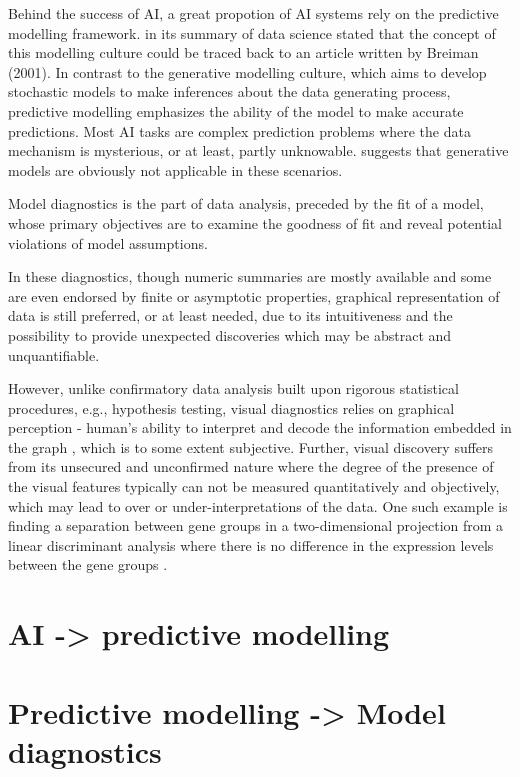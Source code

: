 \documentclass{monashthesis}
\begin{document}
Behind the success of AI, a great propotion of AI systems rely on the predictive modelling framework. \textcite{donoho_50_2017} in its summary of data science stated that the concept of this modelling culture could be traced back to an article written by Breiman (2001). In contrast to the generative modelling culture, which aims to develop stochastic models to make inferences about the data generating process, predictive modelling emphasizes the ability of the model to make accurate predictions. Most AI tasks are complex prediction problems where the data mechanism is mysterious, or at least, partly unknowable. \textcite{breiman_statistical_2001} suggests that generative models are obviously not applicable in these scenarios.

Model diagnostics is the part of data analysis, preceded by the fit of a model, whose primary objectives are to examine the goodness of fit and reveal potential violations of model assumptions.

In these diagnostics, though numeric summaries are mostly available and some are even endorsed by finite or asymptotic properties, graphical representation of data is still preferred, or at least needed, due to its intuitiveness and the possibility to provide unexpected discoveries which may be abstract and
unquantifiable.

However, unlike confirmatory data analysis built upon rigorous statistical procedures, e.g., hypothesis testing, visual diagnostics relies on graphical perception - human's ability to interpret and decode the information embedded in the graph \autocite{cleveland_graphical_1984}, which is to some extent subjective. Further, visual discovery suffers from its unsecured and unconfirmed nature where the degree of the presence of the visual features typically can not be measured quantitatively and objectively, which may lead to over or under-interpretations of the data. One such example is finding a separation between gene groups in a two-dimensional projection from a linear discriminant analysis where there is no difference in the expression levels between the gene groups \autocite{roy_chowdhury_using_2015}.

\hypertarget{ai---predictive-modelling}{%
\section{AI -\textgreater{} predictive modelling}\label{ai---predictive-modelling}}

\hypertarget{predictive-modelling---model-diagnostics}{%
\section{Predictive modelling -\textgreater{} Model diagnostics}\label{predictive-modelling---model-diagnostics}}
\end{document}
